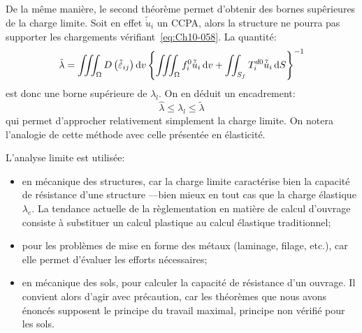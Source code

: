 De la même manière, le second théorème permet d'obtenir des bornes supêrieures de la charge limite.
Soit en effet $\tilde{\dot{u}}_i$ un CCPA, alors la structure ne pourra pas supporter les chargements vérifiant~\eqref{eq:Ch10-058}.
La quantité: 
\begin{equation}
    \tilde{\lambda} = \iiint_{\Omega} D \left( \tilde{\dot{\varepsilon}}_{ij} \right) \mathop{\mathrm{{}d}}\mathopen{} v \left\{ \iiint_{\Omega} f_i^0 \tilde{\dot{u}}_i \mathop{\mathrm{{}d}}\mathopen{} v + \iint_{S_f} T_i^{d0} \tilde{\dot{u}}_i \mathop{\mathrm{{}d}}\mathopen{} S \right\}^{-1}
    \label{eq:Ch10-060}
\end{equation}
est donc une borne supérieure de $\lambda_l$.
On en déduit un encadrement:
\begin{equation}
    \hat{\lambda} \leq \lambda_l \leq \tilde{\lambda}
    \label{eq:Ch10-061}
\end{equation}
qui permet d'approcher relativement simplement la charge limite. 
On notera l'analogie de cette méthode avec celle présentée en élasticité. 

L'analyse limite est utilisée:
\begin{itemize}
    \item en mécanique des structures, car la charge limite caractérise bien la capacité de résistance d'une structure ---bien mieux en tout cas que la charge élastique $\lambda_e$.
        La tendance actuelle de la règlementation en matière de calcul d'ouvrage consiste à substituer un calcul plastique au calcul élastique traditionnel;
    \item pour les problèmes de mise en forme des métaux (laminage, filage, etc.), car elle permet d'évaluer les efforts nécessaires; 
    \item en mécanique des sols, pour calculer la capacité de résistance d'un ouvrage.
        Il convient alors d'agir avec précaution, car les théorèmes que nous avons énoncés supposent le principe du travail maximal, principe non vérifié pour les sols. 
\end{itemize}
